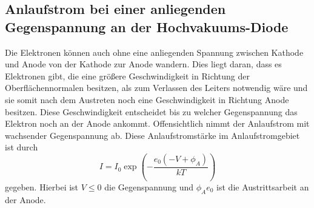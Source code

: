 \subsection{Anlaufstrom bei einer anliegenden Gegenspannung an der Hochvakuums-Diode}
Die Elektronen können auch ohne eine anliegenden Spannung zwischen Kathode und Anode von der Kathode zur Anode wandern. Dies liegt daran, dass es Elektronen gibt, die eine größere Geschwindigkeit in Richtung der Oberflächennormalen besitzen, als zum Verlassen des Leiters notwendig wäre und sie somit nach dem Austreten noch eine Geschwindigkeit in Richtung Anode besitzen. Diese Geschwindigkeit entscheidet bis zu welcher Gegenspannung das Elektron noch an der Anode ankommt. Offensichtlich nimmt der Anlaufstrom mit wachsender Gegenspannung ab. Diese Anlaufstromstärke im Anlaufstromgebiet ist durch 
\begin{equation} 
	I = I_0 \exp\left(-\frac{e_0 (-V +\phi_A)}{k T}\right)
\end{equation}
gegeben. Hierbei ist $V\le0$ die Gegenspannung und $\phi_A e_0$ ist die Austrittsarbeit an der Anode.



